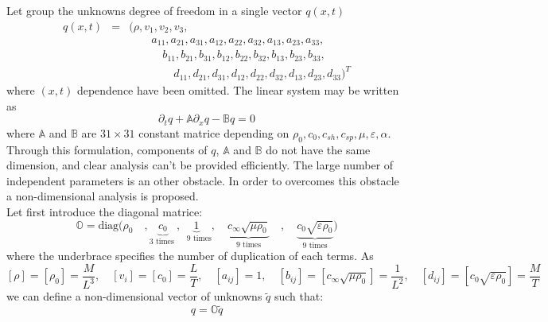 \documentclass[
10pt, %
a4paper, %
oneside, %
headinclude,footinclude, %
table
]{scrartcl}
\begin{document}
Let group the unknowns degree of freedom in a single vector $q(x,t)$
\begin{equation}
\begin{array}{rcl}    
q(x,t)&=&\Big(\rho,v_{1},v_{2},v_{3}, \\
&&	\quad\quad	a_{11}, a_{21}, a_{31},
 	a_{12}, a_{22}, a_{32},
	 a_{13}, a_{23}, a_{33},\\
&& 	\quad\quad\quad 	b_{11}, b_{21}, b_{31},
	b_{12}, b_{22}, b_{32},
 	b_{13}, b_{23}, b_{33},\\
&&  	\quad\quad\quad\quad d_{11}, d_{21}, d_{31},
 		d_{12}, d_{22}, d_{32},
 		d_{13}, d_{23}, d_{33}\Big)^T
\end{array}
\end{equation}
where $(x,t)$ dependence have been omitted. The linear system may be written as 
\begin{equation}\label{LinSyt}
\partial_{t}q+\mathbb{A}\partial_{x}q-\mathbb{B}q=0
\end{equation}
where $\mathbb{A}$ and $\mathbb{B}$ are $31\times 31$ constant matrice depending on $\rho_{0},c_{0},c_{sh},c_{sp},\mu,\varepsilon,\alpha$.\\
Through this formulation, components of $q$, $\mathbb{A}$ and $\mathbb{B}$ do not have the same dimension, and clear analysis can't be provided efficiently. The large number of independent parameters is an other obstacle. In order to overcomes this obstacle a  non-dimensional analysis is proposed.\\
Let first introduce the diagonal matrice:
\begin{equation}
\mathbb{O}=\text{diag}\Big(\rho_{0}\quad,
	\underbrace{c_{0}}_\text{$3$ times },
	\underbrace{1}_\text{ $9$ times}, \quad
	\underbrace{c_{\infty}\sqrt{\mu\rho_{0}}}_{\text{$9$ times}}\quad ,\quad
	\underbrace{c_{0}\sqrt{\varepsilon\rho_{0}}}_{\text{$9$ times}} \Big)
\end{equation}
where the underbrace specifies the number of duplication of each terms. As 
\begin{equation}
\left[\rho\right]=\left[\rho_{0}\right]=\frac{M}{L^3}, \quad
\left[v_{i}\right]=\left[c_{0}\right]=\frac{L}{T}, \quad
\left[a_{ij}\right]=1, \quad
\left[b_{ij}\right]=\left[c_{\infty}\sqrt{\mu\rho_{0}}\right]=\frac{1}{L^2}, \quad
\left[d_{ij}\right]=\left[c_{0}\sqrt{\varepsilon\rho_{0}} \right]=\frac{M}{T}
\end{equation}
we can define a non-dimensional vector of unknowns $\tilde{q}$ such that:
\begin{equation}
q=\mathbb{O}\tilde{q}
\end{equation}
\end{document}
